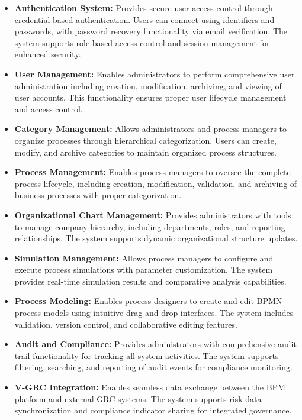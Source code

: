 \begin{itemize}[leftmargin=1cm]
    \item \textbf{Authentication System:} Provides secure user access control through credential-based authentication. Users can connect using identifiers and passwords, with password recovery functionality via email verification. The system supports role-based access control and session management for enhanced security.
    
    \item \textbf{User Management:} Enables administrators to perform comprehensive user administration including creation, modification, archiving, and viewing of user accounts. This functionality ensures proper user lifecycle management and access control.
    
    \item \textbf{Category Management:} Allows administrators and process managers to organize processes through hierarchical categorization. Users can create, modify, and archive categories to maintain organized process structures.
    
    \item \textbf{Process Management:} Enables process managers to oversee the complete process lifecycle, including creation, modification, validation, and archiving of business processes with proper categorization.
    
    \item \textbf{Organizational Chart Management:} Provides administrators with tools to manage company hierarchy, including departments, roles, and reporting relationships. The system supports dynamic organizational structure updates.
    
    \item \textbf{Simulation Management:} Allows process managers to configure and execute process simulations with parameter customization. The system provides real-time simulation results and comparative analysis capabilities.
    
    \item \textbf{Process Modeling:} Enables process designers to create and edit BPMN process models using intuitive drag-and-drop interfaces. The system includes validation, version control, and collaborative editing features.
    
    \item \textbf{Audit and Compliance:} Provides administrators with comprehensive audit trail functionality for tracking all system activities. The system supports filtering, searching, and reporting of audit events for compliance monitoring.
    
    \item \textbf{V-GRC Integration:} Enables seamless data exchange between the BPM platform and external GRC systems. The system supports risk data synchronization and compliance indicator sharing for integrated governance.
\end{itemize}

